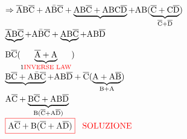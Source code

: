 $ \Rightarrow \negatoA\B\negatoC + \A\negatoBbar\negatoC + \underbrace{\A\B\negatoC + \A\B\C\negatoD} _{} + \A\B(\underbrace{\negatoC + \C\negatoD} _{\negatoC + \negatoD})$ \\

$ \underbrace{\negatoA\B\negatoC} _{} + \A\negatoBbar\negatoC + \underbrace{\A\B\negatoC} _{} + \A\B\negatoD$ \\

$ \B\negatoC(\underbrace{\negatoA + \A} _{1\inverse}) $ \\

$ \underbrace{\B\negatoC + \A\negatoBbar\negatoC} _{} + \A\B\negatoD + \negatoC(\underbrace{\A + \A\negatoB} _{\B + \A})$ \\

$ \A\negatoC + \underbrace{\B\negatoC + \A\B\negatoD} _{\B(\negatoC + \A\negatoD)} $ \\

$ \color{red}\boxed{\normalcolor\A\negatoC + \B(\negatoC + \A\negatoD)} \hspace{0.3cm}\SOLUZIONE$ \\


